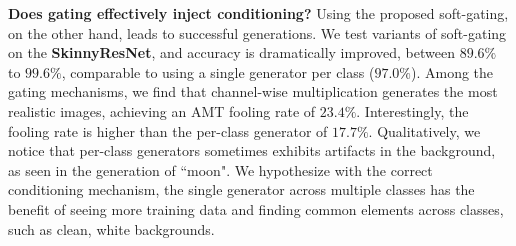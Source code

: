 
\vspace{2mm} \noindent \textbf{Does gating effectively inject conditioning?} Using the proposed soft-gating, on the other hand, leads to successful generations. We test variants of soft-gating on the \textbf{SkinnyResNet}, and accuracy is dramatically improved, between $89.6\%$ to $99.6\%$, comparable to using a single generator per class ($97.0\%$).
Among the gating mechanisms, we find that channel-wise multiplication
generates the most realistic images, achieving an AMT fooling rate of $23.4\%$. Interestingly, the fooling rate is higher than the per-class generator of $17.7\%$. Qualitatively, we notice that per-class generators sometimes exhibits artifacts in the background, as seen in the generation of ``moon". We hypothesize with the correct conditioning mechanism, the single generator across multiple classes has the benefit of seeing more training data and finding common elements across classes, such as clean, white backgrounds.



